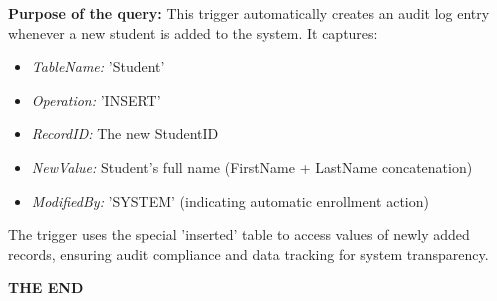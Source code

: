 \documentclass[12pt,a4paper]{report}
\begin{document}
\textbf{Purpose of the query:} This trigger automatically creates an audit log entry whenever a new student is added to the system. It captures:
\begin{itemize}
    \item \textit{TableName:} 'Student'
    \item \textit{Operation:} 'INSERT'
    \item \textit{RecordID:} The new StudentID
    \item \textit{NewValue:} Student's full name (FirstName + LastName concatenation)
    \item \textit{ModifiedBy:} 'SYSTEM' (indicating automatic enrollment action)
\end{itemize}
The trigger uses the special 'inserted' table to access values of newly added records, ensuring audit compliance and data tracking for system transparency.\\
\vfill

\begin{center}
    {\fontsize{50pt}{0}\selectfont \textbf{THE END}}
\end{center}

\vfill
\end{document}
